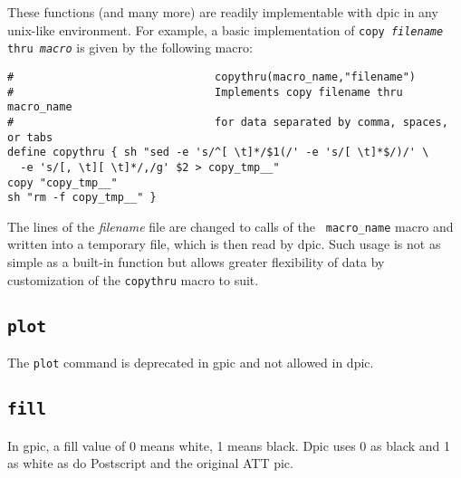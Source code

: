 \documentclass[11pt]{article}
\newcommand{\bq}{}
\newcommand{\dpic}{{\bq dpic}}
\newcommand{\ntt}[1]{\\\hbox{}\quad{\tt #1}}
\begin{document}
  These functions (and many more) are readily implementable with dpic in any
  unix-like environment.
%
%
%
For example, a basic implementation of
{\tt copy {\sl filename} thru {\sl macro}}
is given by the following macro:
\begin{verbatim}
#                               copythru(macro_name,"filename")
#                               Implements copy filename thru macro_name 
#                               for data separated by comma, spaces, or tabs
define copythru { sh "sed -e 's/^[ \t]*/$1(/' -e 's/[ \t]*$/)/' \
  -e 's/[, \t][ \t]*/,/g' $2 > copy_tmp__"
copy "copy_tmp__"
sh "rm -f copy_tmp__" }
\end{verbatim}
The lines of the {\sl filename} file are changed to calls of the {\tt
macro\_name} macro and written into a temporary file, which is then
read by \dpic.  Such usage is not as simple as a built-in function but
allows greater flexibility of data by customization of the {\tt copythru}
macro to suit.

\subsection{{\tt plot}}
  The {\tt plot} command is deprecated in gpic and not allowed in dpic.

\subsection{{\tt fill}}
  In gpic, a fill value of 0 means white, 1 means black.
  Dpic uses 0 as black and 1 as
  white as do Postscript and the original ATT pic.
\end{document}
